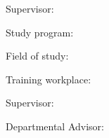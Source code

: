 


Supervisor: \mySupervisor

\medskip{}
\myDate


\newpage
\thispagestyle{empty}
\mbox{}
\newpage





Study program: \myStudyProgram

Field of study: \myStudyField

Training workplace: \myInstitude

Supervisor: \mySupervisor

Departmental Advisor: \myDepartSupervisor

\medskip{}

\myDate


\newpage
\thispagestyle{empty}
\mbox{}
\newpage

